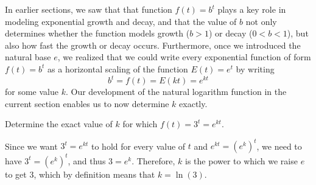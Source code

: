 \documentclass[nooutcomes]{ximera}
\begin{document}
In earlier sections, we saw that that function \(f(t) = b^t\) plays a key role in modeling exponential growth and decay, and that the value of \(b\) not only determines whether the function models growth (\(b > 1\)) or decay (\(0 < b < 1\)), but also how fast the growth or decay occurs.  Furthermore, once we introduced the natural base \(e\), we realized that we could write every exponential function of form \(f(t) = b^t\) as a horizontal scaling of the function \(E(t) = e^t\) by writing%
\begin{equation*}
b^t = f(t) = E(kt) = e^{kt}
\end{equation*}
for some value \(k\).  Our development of the natural logarithm function in the current section enables us to now determine \(k\) exactly.%
\begin{example}

Determine the exact value of \(k\) for which \(f(t) = 3^t = e^{kt}\).%

\begin{explanation} Since we want \(3^t = e^{kt}\) to hold for every value of \(t\) and \(e^{kt} = (e^k)^t\), we need to have \(3^t = (e^k)^t\), and thus \(3 = e^k\).  Therefore, \(k\) is the power to which we raise \(e\) to get \(3\), which by definition means that \(k = \ln(3)\).%
\end{explanation}
\end{example}
\end{document}
